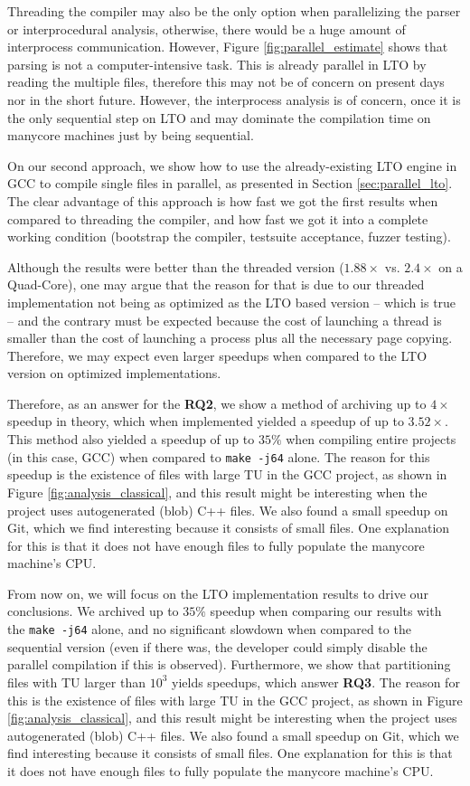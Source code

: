Threading the compiler may also be the only option when parallelizing the
parser or interprocedural analysis, otherwise, there would be a huge amount of
interprocess communication. However, Figure \ref{fig:parallel_estimate} shows
that parsing is not a computer-intensive task. This is already parallel in LTO
by reading the multiple files, therefore this may not be of concern on present
days nor in the short future. However, the interprocess analysis is of concern,
once it is the only sequential step on LTO and may dominate the compilation
time on manycore machines just by being sequential.

On our second approach, we show how to use the already-existing LTO engine in
GCC to compile single files in parallel, as presented in Section
\ref{sec:parallel_lto}. The clear advantage of this approach is how fast we got
the first results when compared to threading the compiler, and how fast we got
it into a complete working condition (bootstrap the compiler, testsuite
acceptance, fuzzer testing).

Although the results were better than the threaded version ($1.88\times$ vs. $2.4\times$
on a Quad-Core),
one may argue that the reason for that is due to our threaded implementation
not being as optimized as the LTO based version -- which is true -- and the
contrary must be expected because the cost of launching a thread is smaller
than the cost of launching a process plus all the necessary page copying.
Therefore, we may expect even larger speedups when compared to the LTO version
on optimized implementations.

Therefore, as an answer for the \textbf{RQ2}, we show a method of archiving up
to $4\times$ speedup in theory, which when implemented yielded a speedup of up
to $3.52\times$. This method also yielded a speedup of up to $35\%$ when
compiling entire projects (in this case, GCC) when compared to \texttt{make
-j64} alone. The reason for this speedup is the existence of files with large
TU in the GCC project, as shown in Figure \ref{fig:analysis_classical}, and
this result might be interesting when the project uses autogenerated (blob) C++
files. We also found a small speedup on Git, which we find interesting because
it consists of small files. One explanation for this is that it does not have
enough files to fully populate the manycore machine's CPU.

From now on, we will focus on the LTO implementation results to drive our
conclusions. We archived up to $35\%$ speedup when comparing our results with
the \texttt{make -j64} alone, and no significant slowdown when compared to the
sequential version (even if there was, the developer could simply disable the
parallel compilation if this is observed). Furthermore, we show that
partitioning files with TU larger than $10^3$ yields speedups, which answer
\textbf{RQ3}. The reason for this is the existence of files with large TU in
the GCC project, as shown in Figure \ref{fig:analysis_classical}, and this
result might be interesting when the project uses autogenerated (blob) C++
files. We also found a small speedup on Git, which we find interesting because
it consists of small files. One explanation for this is that it does not have
enough files to fully populate the manycore machine's CPU.

